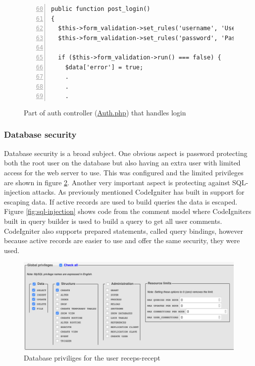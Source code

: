 \documentclass[a4paper]{scrartcl}
\begin{document}
\begin{figure}
\begin{lstlisting}[frame=single, numbers=left, breaklines=true, basicstyle=\ttfamily\footnotesize, firstnumber=60]
public function post_login()
{
  $this->form_validation->set_rules('username', 'Username', 'required');
  $this->form_validation->set_rules('password', 'Password', 'required');

  if ($this->form_validation->run() === false) {
    $data['error'] = true;
    .
    .
    .
\end{lstlisting}
\caption{Part of auth controller (\href{https://github.com/juliuscc/kth-id1354/blob/master/homework-3/application/controllers/Auth.php\#L60}{Auth.php}) that handles login}
\label{fig:auth-login}
\end{figure}

\subsubsection{Database security}
Database security is a broad subject. One obvious aspect is password protecting both the root user on the database but also having an extra user with limited access for the web server to use. This was configured and the limited privileges are shown in figure \ref{fig:database-privileges}. Another very important aspect is protecting against SQL-injection attacks. As previously mentioned CodeIgniter has built in support for escaping data. If active records are used to build queries the data is escaped. Figure \ref{fig:sql-injection} shows code from the comment model where CodeIgniters built in query builder is used to build a query to get all user comments. CodeIgniter also supports prepared statements, called query bindings, however because active records are easier to use and offer the same security, they were used.

\begin{figure}
	\begin{center}
		\includegraphics[width=0.7\linewidth]{images/database-privileges.png}
		\caption{Database priviliges for the user receps-recept}
		\label{fig:database-privileges}
	\end{center}
\end{figure}
\end{document}

